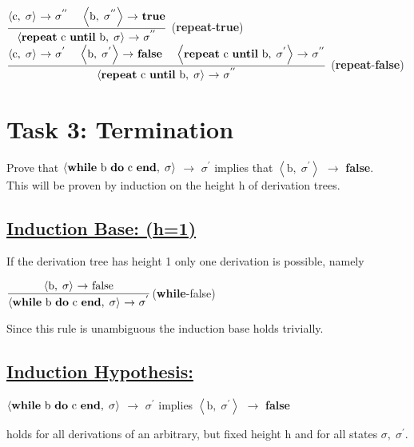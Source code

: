 \documentclass[12pt]{scrartcl}
\newcommand{\eRelation}[2]{$\dfrac{\text{#1}}{\text{#2}}$}
\newcommand{\eState}[2]{$\left\langle \text{#1},\; \text{#2}\right\rangle$}
\newcommand{\eRule}[3]{\eState{#1}{#2} $\rightarrow$ #3}
\begin{document}
		\begin{center}
			\eRelation
				{\eRule{c}{$\sigma$}{$\sigma ^{''}$ \quad \eRule{b}{$\sigma ^{''}$}{\textbf{true}}}}
				{\eRule{\textbf{repeat} c \textbf{until} b}{$\sigma$}{$\sigma ^{''}$}}
			(\textbf{repeat}-\textbf{true})\\[0.75cm]
			\eRelation
				{\eRule{c}{$\sigma$}{$\sigma ^{'}$} \quad \eRule{b}{$\sigma ^{'}$}{\textbf{false}} \quad \eRule{\textbf{repeat} c \textbf{until} b}{$\sigma ^{'}$}{$\sigma ^{''}$}}
				{\eRule{\textbf{repeat} c \textbf{until} b}{$\sigma$}{$\sigma ^{''}$}}
			(\textbf{repeat}-\textbf{false})\\
		\end{center}
	\section*{Task 3: Termination}
		\indent\indent Prove that \eRule{\textbf{while} b \textbf{do} c \textbf{end}}{$\sigma$}{$\sigma ^{'}$} implies that \eRule{b}{$\sigma ^{'}$}{\textbf{false}}.\\
		\indent This will be proven by induction on the height h of derivation trees.\\
		\subsection*{\underline{Induction Base: (h=1)}}
		\indent\indent If the derivation tree has height 1 only one derivation is possible, namely\\
		\begin{center}
			\eRelation
				{\eRule{b}{$\sigma$}{false}}
				{\eRule{\textbf{while} b \textbf{do} c \textbf{end}}{$\sigma$}{$\sigma ^{'}$}}(\textbf{while}-false)
		\end{center}
		\indent\indent Since this rule is unambiguous the induction base holds trivially.\\\newpage
		\subsection*{\underline{Induction Hypothesis:}}
		\begin{center}
			\eRule{\textbf{while} b \textbf{do} c \textbf{end}}{$\sigma$}{$\sigma ^{'}$} implies \eRule{b}{$\sigma ^{'}$}{\textbf{false}}
		\end{center}
		\indent\indent holds for all derivations of an arbitrary, but fixed height h and for all states \indent$\sigma , \; \sigma ^{'}$.\\
\end{document}

